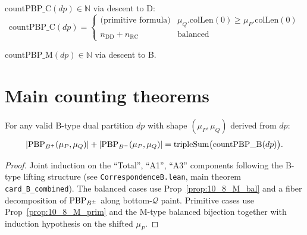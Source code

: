 \begin{definition}
  \label{def:countPBP_C}
  \leanok
  $\mathrm{countPBP\_C}(dp) \in \mathbb{N}$ via descent to D:
  \[
    \mathrm{countPBP\_C}(dp) =
    \begin{cases}
      \text{(primitive formula)} & \mu_Q.\mathrm{colLen}(0) \geq \mu_P.\mathrm{colLen}(0) \\
      n_{\mathrm{DD}} + n_{\mathrm{RC}} & \text{balanced}
    \end{cases}
  \]
\end{definition}

\begin{definition}
  \label{def:countPBP_M}
  \leanok
  $\mathrm{countPBP\_M}(dp) \in \mathbb{N}$ via descent to B.
\end{definition}

\section{Main counting theorems}

\begin{proposition}
  \label{prop:10_11_B}
  \leanok
  For any valid B-type dual partition $dp$ with shape $(\mu_P, \mu_Q)$ derived from $dp$:
  \[ |\mathrm{PBP}_{B^+}(\mu_P, \mu_Q)| + |\mathrm{PBP}_{B^-}(\mu_P, \mu_Q)| = \mathrm{tripleSum}\big(\mathrm{countPBP\_B}(dp)\big). \]
\end{proposition}
\begin{proof}
  \leanok
  Joint induction on the ``Total'', ``A1'', ``A3'' components following the
  B-type lifting structure (see \texttt{CorrespondenceB.lean}, main theorem
  \texttt{card\_B\_combined}). The balanced cases use Prop~\ref{prop:10_8_M_bal}
  and a fiber decomposition of $\mathrm{PBP}_{B^\pm}$ along bottom-$\mathcal{Q}$ paint.
  Primitive cases use Prop~\ref{prop:10_8_M_prim} and the M-type balanced
  bijection together with induction hypothesis on the shifted $\mu_P$.
\end{proof}

